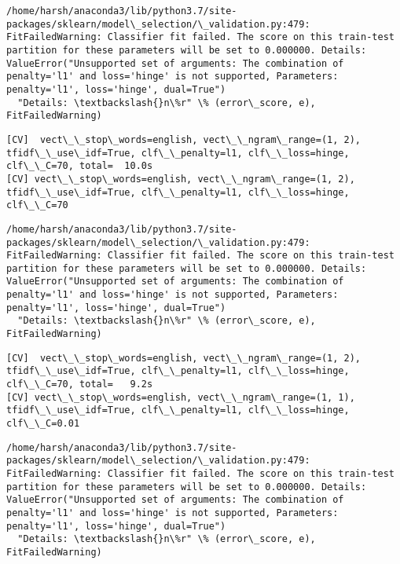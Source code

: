 \documentclass[11pt]{article}
\begin{document}
    \begin{Verbatim}[commandchars=\\\{\}]
/home/harsh/anaconda3/lib/python3.7/site-packages/sklearn/model\_selection/\_validation.py:479: FitFailedWarning: Classifier fit failed. The score on this train-test partition for these parameters will be set to 0.000000. Details: 
ValueError("Unsupported set of arguments: The combination of penalty='l1' and loss='hinge' is not supported, Parameters: penalty='l1', loss='hinge', dual=True")
  "Details: \textbackslash{}n\%r" \% (error\_score, e), FitFailedWarning)

    \end{Verbatim}

    \begin{Verbatim}[commandchars=\\\{\}]
[CV]  vect\_\_stop\_words=english, vect\_\_ngram\_range=(1, 2), tfidf\_\_use\_idf=True, clf\_\_penalty=l1, clf\_\_loss=hinge, clf\_\_C=70, total=  10.0s
[CV] vect\_\_stop\_words=english, vect\_\_ngram\_range=(1, 2), tfidf\_\_use\_idf=True, clf\_\_penalty=l1, clf\_\_loss=hinge, clf\_\_C=70 

    \end{Verbatim}

    \begin{Verbatim}[commandchars=\\\{\}]
/home/harsh/anaconda3/lib/python3.7/site-packages/sklearn/model\_selection/\_validation.py:479: FitFailedWarning: Classifier fit failed. The score on this train-test partition for these parameters will be set to 0.000000. Details: 
ValueError("Unsupported set of arguments: The combination of penalty='l1' and loss='hinge' is not supported, Parameters: penalty='l1', loss='hinge', dual=True")
  "Details: \textbackslash{}n\%r" \% (error\_score, e), FitFailedWarning)

    \end{Verbatim}

    \begin{Verbatim}[commandchars=\\\{\}]
[CV]  vect\_\_stop\_words=english, vect\_\_ngram\_range=(1, 2), tfidf\_\_use\_idf=True, clf\_\_penalty=l1, clf\_\_loss=hinge, clf\_\_C=70, total=   9.2s
[CV] vect\_\_stop\_words=english, vect\_\_ngram\_range=(1, 1), tfidf\_\_use\_idf=True, clf\_\_penalty=l1, clf\_\_loss=hinge, clf\_\_C=0.01 

    \end{Verbatim}

    \begin{Verbatim}[commandchars=\\\{\}]
/home/harsh/anaconda3/lib/python3.7/site-packages/sklearn/model\_selection/\_validation.py:479: FitFailedWarning: Classifier fit failed. The score on this train-test partition for these parameters will be set to 0.000000. Details: 
ValueError("Unsupported set of arguments: The combination of penalty='l1' and loss='hinge' is not supported, Parameters: penalty='l1', loss='hinge', dual=True")
  "Details: \textbackslash{}n\%r" \% (error\_score, e), FitFailedWarning)

    \end{Verbatim}
\end{document}

